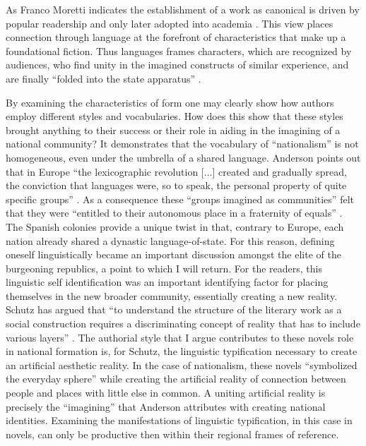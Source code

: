 \documentclass[12pt]{report}
\begin{document}
As Franco Moretti indicates the establishment of a work as canonical is driven by popular readership and only later adopted into academia \autocite[]{Moretti2013}.
This view places connection through language at the forefront of characteristics that make up a foundational fiction. 
Thus languages frames characters, which are recognized by audiences, who find unity in the imagined constructs of similar experience, and are finally \enquote{folded into the state apparatus} \autocite[27]{Felski2008}.

By examining the characteristics of form one may clearly show how authors employ different styles and vocabularies.
How does this show that these styles brought anything to their success or their role in aiding in the imagining of a national community?
It demonstrates that the vocabulary of \enquote{nationalism} is not homogeneous, even under the umbrella of a shared language.
Anderson points out that in Europe \enquote{the lexicographic revolution [...] created and gradually spread, the conviction that languages were, so to speak, the personal property of quite specific groups} \autocite[84]{Anderson2006}.
As a consequence these \enquote{groups imagined as communities} felt that they were \enquote{entitled to their autonomous place in a fraternity of equals} \autocite[84]{Anderson2006}.
The Spanish colonies provide a unique twist in that, contrary to Europe, each nation already shared a dynastic language-of-state.
For this reason, defining oneself linguistically became an important discussion amongst the elite of the burgeoning republics, a point to which I will return.
For the readers, this linguistic self identification was an important identifying factor for placing themselves in the new broader community, essentially creating a new reality.
Schutz has argued that \enquote{to understand the structure of the literary work as a social construction requires a discriminating concept of reality that has to include various layers} \autocite[79]{Embree1998}.
The authorial style that I argue contributes to these novels role in national formation is, for Schutz, the linguistic typification necessary to create an artificial aesthetic reality.
In the case of nationalism, these novels \enquote{symbolized the everyday sphere} while creating the artificial reality of connection between people and places with little else in common.
A uniting artificial reality is precisely the \enquote{imagining} that Anderson attributes with creating national identities. 
Examining the manifestations of linguistic typification, in this case in novels, can only be productive then within their regional frames of reference.
\end{document}
